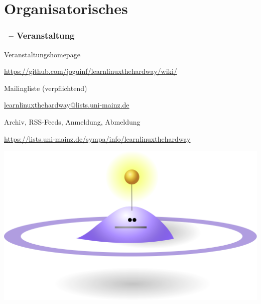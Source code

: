 \documentclass[utf8]{beamer}
\begin{document}
\begin{frame}
\end{frame}

\section{Organisatorisches}

\begin{frame}
  \frametitle{\insertsectionhead\ -- Veranstaltung}  
  
  \begin{block}{Veranstaltungshomepage}
  \begin{center}\url{https://github.com/joguinf/learnlinuxthehardway/wiki/}\end{center}
  \end{block}
  
  \begin{block}{Mailingliste (verpflichtend)}
  \begin{center}\url{learnlinuxthehardway@lists.uni-mainz.de}\end{center}
  \end{block}
  
  \begin{block}{Archiv, RSS-Feeds, Anmeldung, Abmeldung}
  \begin{center} \url{https://lists.uni-mainz.de/sympa/info/learnlinuxthehardway} \end{center}
  \end{block}
  \begin{center}  
  \includegraphics[scale=0.2]{media/znurt.png}
  \end{center}
\end{frame}
\end{document}
